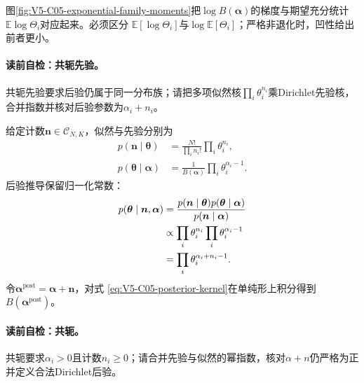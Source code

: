 图\ref{fig:V5-C05-exponential-family-moments}把$\log B(\boldsymbol\alpha)$的梯度与期望充分统计$\mathbb E\log\Theta_i$对应起来。必须区分
$\mathbb E[\log\Theta_i]$与$\log\mathbb E[\Theta_i]$；严格非退化时，凹性给出前者更小。


\paragraph{读前自检：共轭先验。}共轭先验要求后验仍属于同一分布族；请把多项似然核$\prod_i\theta_i^{n_i}$乘Dirichlet先验核，合并指数并核对后验参数为$\alpha_i+n_i$。\par


给定计数$\boldsymbol n\in\mathcal C_{N,K}$，似然与先验分别为
\begin{align}
p(\boldsymbol n\mid\boldsymbol\theta)
&=\frac{N!}{\prod_i n_i!}\prod_i\theta_i^{n_i},
\label{eq:V5-C05-count-likelihood}\\
p(\boldsymbol\theta\mid\boldsymbol\alpha)
&=\frac1{B(\boldsymbol\alpha)}
\prod_i\theta_i^{\alpha_i-1}.
\label{eq:V5-C05-dirichlet-prior}
\end{align}
后验推导保留归一化常数：
\begin{align}
p(\boldsymbol\theta\mid\boldsymbol n,\boldsymbol\alpha)
&=\frac{
p(\boldsymbol n\mid\boldsymbol\theta)
p(\boldsymbol\theta\mid\boldsymbol\alpha)}
{p(\boldsymbol n\mid\boldsymbol\alpha)}\notag\\
&\propto
\prod_i\theta_i^{n_i}
\prod_i\theta_i^{\alpha_i-1}\notag\\
&=\prod_i\theta_i^{\alpha_i+n_i-1}.
\label{eq:V5-C05-posterior-kernel}
\end{align}
令$\boldsymbol\alpha^{\mathrm{post}}=\boldsymbol\alpha+\boldsymbol n$，对式
\eqref{eq:V5-C05-posterior-kernel}在单纯形上积分得到$B(\boldsymbol\alpha^{\mathrm{post}})$。

\paragraph{读前自检：共轭。}\DirichletMultinomial{}共轭要求$\alpha_i>0$且计数$n_i\ge0$；请合并先验与似然的幂指数，核对$\alpha+n$仍严格为正并定义合法Dirichlet后验。\par

